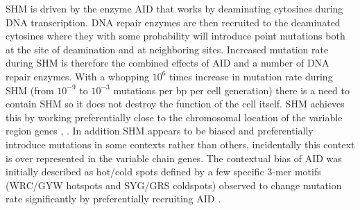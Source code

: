 
















SHM is driven by the enzyme AID that works by deaminating cytosines during DNA transcription.
DNA repair enzymes are then recruited to the deaminated cytosines where they with some probability will introduce point mutations both at the site of deamination and at neighboring sites.
Increased mutation rate during SHM is therefore the combined effects of AID and a number of DNA repair enzymes.
With a whopping $10^6$ times increase in mutation rate during SHM (from $10^{-9}$ to $10^{-3}$ mutations per bp per cell generation) there is a need to contain SHM so it does not destroy the function of the cell itself.
SHM achieves this by working preferentially close to the chromosomal location of the variable region genes \cite{Yeap_2015}, \cite{liu2008two}.
In addition SHM appears to be biased and preferentially introduce mutations in some contexts rather than others, incidentally this context is over represented in the variable chain genes.
The contextual bias of AID was initially described as hot/cold spots defined by a few specific 3-mer motifs (WRC/GYW hotspots and SYG/GRS coldspots) observed to change mutation rate significantly by preferentially recruiting AID \cite{pham2003processive}.

